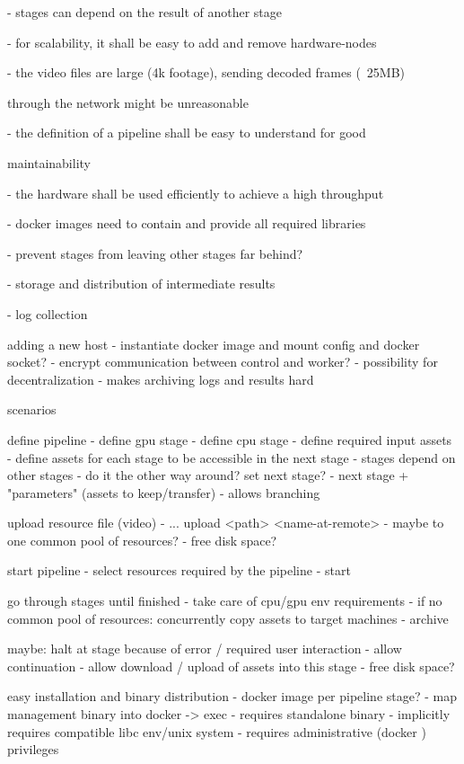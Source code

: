 - stages can depend on the result of another stage

- for scalability, it shall be easy to add and remove hardware-nodes

- the video files are large (4k footage), sending decoded frames (~25MB)

through the network might be unreasonable

- the definition of a pipeline shall be easy to understand for good

maintainability

- the hardware shall be used efficiently to achieve a high throughput

- docker images need to contain and provide all required libraries

- prevent stages from leaving other stages far behind?

- storage and distribution of intermediate results

- log collection




adding a new host
 - instantiate docker image and mount config and docker socket?
 - encrypt communication between control and worker?
 - possibility for decentralization
    - makes archiving logs and results hard


scenarios

define pipeline
 - define gpu stage
 - define cpu stage
 - define required input assets
 - define assets for each stage to be accessible in the next stage
 - stages depend on other stages
    - do it the other way around? set next stage?
       - next stage + "parameters" (assets to keep/transfer)
       - allows branching

upload resource file (video)
 - ... upload <path> <name-at-remote>
 - maybe to one common pool of resources?
    - free disk space?

start pipeline
 - select resources required by the pipeline
 - start
 
go through stages until finished
 - take care of cpu/gpu env requirements
 - if no common pool of resources: concurrently copy assets to target machines
 - archive 

maybe: halt at stage because of error / required user interaction
 - allow continuation
 - allow download / upload of assets into this stage
    - free disk space?
 
 
 easy installation and binary distribution
  - docker image per pipeline stage?
  - map management binary into docker -> exec
     - requires standalone binary
     - implicitly requires compatible libc env/unix system
     - requires administrative (docker ) privileges
     
